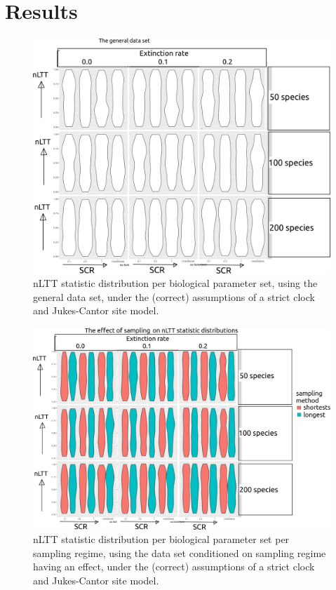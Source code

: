 \documentclass{article}
\begin{document}
\section{Results}

\begin{figure}[!htbp]
  \includegraphics[width=\textwidth]{fig_general.png}
  \caption{
    nLTT statistic distribution per biological parameter set, using the
    general data set, 
    under the (correct) assumptions of a strict clock and Jukes-Cantor site model.
  }
\end{figure}

\begin{figure}[!htbp]
  \includegraphics[width=\textwidth]{fig_sampling.png}
  \caption{
    nLTT statistic distribution per biological parameter set per sampling
    regime, using the data set conditioned on sampling regime having an effect, 
    under the (correct) assumptions of a strict clock and Jukes-Cantor site model.
  }
\end{figure}
\end{document}
